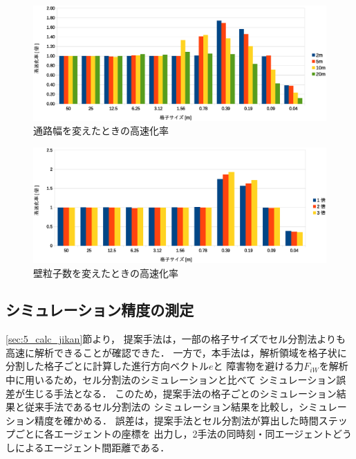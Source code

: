 \begin{figure}[tb]
 \begin{center}
  \includegraphics[width=12.5cm,clip]{figure/5_kousokukaritu.eps}
  \caption{通路幅を変えたときの高速化率}
  \label{fig:5_kousokuka_haba}
 \end{center}
\end{figure}


\begin{figure}[tb]
 \begin{center}
  \includegraphics[width=12.5cm,clip]{figure/5_bai_kousokukaritu.eps}
  \caption{壁粒子数を変えたときの高速化率}
  \label{fig:5_kousokuka_atusa}
 \end{center}
\end{figure}


\clearpage
\subsection{シミュレーション精度の測定}
\ref{sec:5_calc_jikan}節より，
提案手法は，一部の格子サイズでセル分割法よりも高速に解析できることが確認できた．
一方で，本手法は，解析領域を格子状に分割した格子ごとに計算した進行方向ベクトル$e$と
障害物を避ける力$F_{iW}$を解析中に用いるため，セル分割法のシミュレーションと比べて
シミュレーション誤差が生じる手法となる．
このため，提案手法の格子ごとのシミュレーション結果と従来手法であるセル分割法の
シミュレーション結果を比較し，シミュレーション精度を確かめる．
誤差は，提案手法とセル分割法が算出した時間ステップごとに各エージェントの座標を
出力し，2手法の同時刻・同エージェントどうしによるエージェント間距離である．

